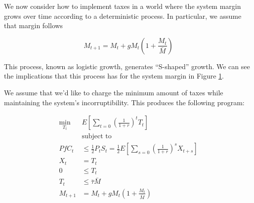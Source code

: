
We now consider how to implement taxes in a world where the system margin grows over time
according to a deterministic process. In particular, we assume that margin follows

$$M_{t+1} = M_{t} + g M_{t} \left(1 + \frac{M_{t}}{\bar{M}} \right)$$

This process, known as logistic growth, generates ``S-shaped'' growth. We can see the implications
that this process has for the system margin in Figure \ref{fig:dg_margin_growth}.

\begin{center}
  \begin{figure}[H]
    \label{fig:dg_margin_growth}
  \end{figure}
\end{center}


We assume that we'd like to charge the minimum amount of taxes while maintaining the system's
incorruptibility. This produces the following program:

\begin{align*}
  \min_{T_t} \; &E \left[ \sum_{t=0} \left(\frac{1}{1 + r} \right)^t T_t \right] \\
  &\text{subject to} \\
  PfC_t &\leq \frac{1}{2} P_t S_t = \frac{1}{2} E \left[ \sum_{s=0} \left(\frac{1}{1 + r}\right)^s  X_{t + s} \right] \\
  X_{t} &= T_t \\
  0 &\leq T_t \\
  T_t &\leq \bar{\tau} \bar{M} \\
  M_{t+1} &= M_{t} + g M_{t} \left(1 + \frac{M_t}{\bar{M}} \right)
\end{align*}

